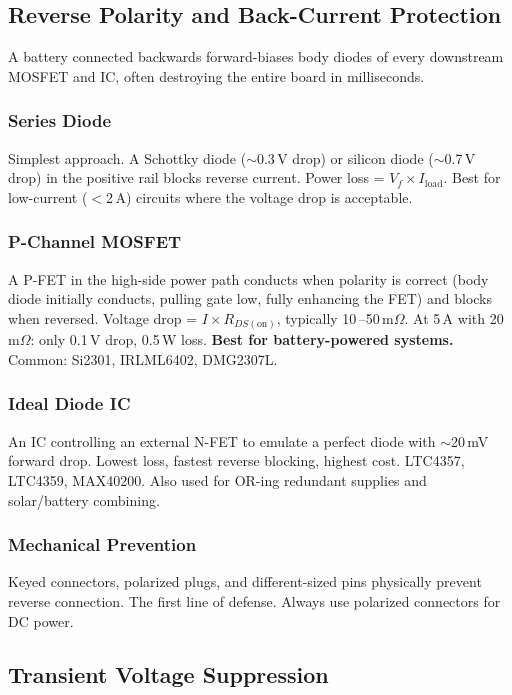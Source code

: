\subsection{Reverse Polarity and Back-Current Protection}
\label{sec:reverse}

A battery connected backwards forward-biases body diodes of every downstream MOSFET and IC, often destroying the entire board in milliseconds.

\subsubsection{Series Diode}
Simplest approach. A Schottky diode ($\sim$0.3\,V drop) or silicon diode ($\sim$0.7\,V drop) in the positive rail blocks reverse current. Power loss = $V_f \times I_{\text{load}}$. Best for low-current ($<$2\,A) circuits where the voltage drop is acceptable.

\subsubsection{P-Channel MOSFET}
A P-FET in the high-side power path conducts when polarity is correct (body diode initially conducts, pulling gate low, fully enhancing the FET) and blocks when reversed. Voltage drop = $I \times R_{DS(\text{on})}$, typically 10\,--50\,m$\Omega$. At 5\,A with 20\,m$\Omega$: only 0.1\,V drop, 0.5\,W loss. \textbf{Best for battery-powered systems.} Common: Si2301, IRLML6402, DMG2307L.

\subsubsection{Ideal Diode IC}
An IC controlling an external N-FET to emulate a perfect diode with $\sim$20\,mV forward drop. Lowest loss, fastest reverse blocking, highest cost. LTC4357, LTC4359, MAX40200. Also used for OR-ing redundant supplies and solar/battery combining.

\subsubsection{Mechanical Prevention}
Keyed connectors, polarized plugs, and different-sized pins physically prevent reverse connection. The first line of defense. Always use polarized connectors for DC power.


\subsection{Transient Voltage Suppression}
\label{sec:transient}

